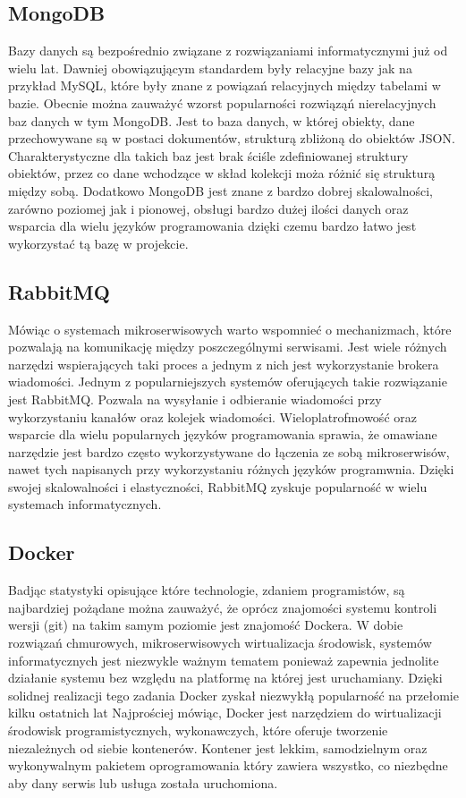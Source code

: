 \subsection{MongoDB}
Bazy danych są bezpośrednio związane z rozwiązaniami informatycznymi już od wielu lat. Dawniej obowiązującym standardem były relacyjne bazy jak na przykład MySQL, które były znane z powiązań relacyjnych między tabelami w bazie. Obecnie można zauważyć wzorst popularności rozwiąząń nierelacyjnych baz danych w tym MongoDB.
Jest to baza danych, w której obiekty, dane przechowywane są w postaci dokumentów, strukturą zbliżoną do obiektów JSON. Charakterystyczne dla takich baz jest brak ściśle zdefiniowanej struktury obiektów, przez co dane wchodzące w skład kolekcji moża różnić się strukturą między sobą.
Dodatkowo MongoDB jest znane z bardzo dobrej skalowalności, zarówno poziomej jak i pionowej, obsługi bardzo dużej ilości danych oraz wsparcia dla wielu języków programowania dzięki czemu bardzo łatwo jest wykorzystać tą bazę w projekcie. 

\subsection{RabbitMQ}
Mówiąc o systemach mikroserwisowych warto wspomnieć o mechanizmach, które pozwalają na komunikację między poszczególnymi serwisami. Jest wiele różnych narzędzi wspierających taki proces a jednym z nich jest wykorzystanie brokera wiadomości.
Jednym z popularniejszych systemów oferujących takie rozwiązanie jest RabbitMQ. Pozwala na wysyłanie i odbieranie wiadomości przy wykorzystaniu kanałów oraz kolejek wiadomości. Wieloplatrofmowość oraz wsparcie dla wielu popularnych języków programowania sprawia, że omawiane narzędzie jest bardzo często wykorzystywane do łączenia ze sobą mikroserwisów, nawet tych napisanych przy wykorzystaniu różnych języków programwnia. Dzięki swojej skalowalności i elastyczności, RabbitMQ zyskuje popularność w wielu systemach informatycznych.


\subsection{Docker}
Badjąc statystyki opisujące które technologie, zdaniem programistów, są najbardziej pożądane można zauważyć, że oprócz znajomości systemu kontroli wersji (git) na takim samym poziomie jest znajomość Dockera. W dobie rozwiązań chmurowych, mikroserwisowych wirtualizacja środowisk, systemów informatycznych jest niezwykle ważnym tematem ponieważ zapewnia jednolite działanie systemu bez względu na platformę na której jest uruchamiany. Dzięki solidnej realizacji tego zadania Docker zyskał niezwykłą popularność na przełomie kilku ostatnich lat 
Najprościej mówiąc, Docker jest narzędziem do wirtualizacji środowisk programistycznych, wykonawczych, które oferuje tworzenie niezależnych od siebie kontenerów. Kontener jest lekkim, samodzielnym oraz wykonywalnym pakietem oprogramowania który zawiera wszystko, co niezbędne aby dany serwis lub usługa została uruchomiona.
